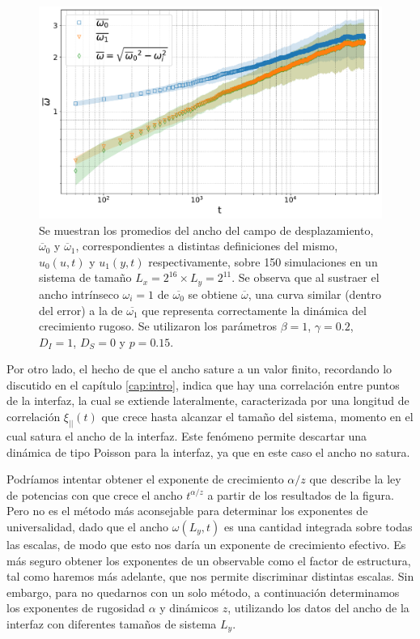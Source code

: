 \begin{figure}[t]
    \centering
    \includegraphics[width=\imsizeL]{omegas.pdf}
    \caption[Anchos $\overline{\omega}_0$ y $\overline{\omega}_1$ del frente de infectados]{Se muestran los promedios del ancho del campo de desplazamiento, $\overline{\omega}_0$ y $\overline{\omega}_1$, correspondientes a distintas definiciones del mismo, $u_0(u,t)$ y $u_1(y,t)$ respectivamente, sobre 150 simulaciones en un sistema de tamaño $L_x = 2^{16} \times L_y = 2^{11}$. Se observa que al sustraer el ancho intrínseco $\omega_i = 1$ de $\overline{\omega_0}$ se obtiene $\overline{\omega}$, una curva similar (dentro del error) a la de $\overline{\omega_1}$ que representa correctamente la dinámica del crecimiento rugoso. Se utilizaron los parámetros $\beta = 1$, $\gamma = 0.2$, $D_I = 1$, $D_S = 0$ y $p=0.15$.}  
    \label{fig:omegas}
\end{figure}

Por otro lado, el hecho de que el ancho sature a un valor finito, recordando lo discutido en el capítulo \ref{cap:intro}, indica que hay una correlación entre puntos de la interfaz, la cual se extiende lateralmente, caracterizada por una longitud de correlación $\xi_{||}(t)$ que crece hasta alcanzar el tamaño del sistema, momento en el cual satura el ancho de la interfaz. Este fenómeno permite descartar una dinámica de tipo Poisson para la interfaz, ya que en este caso el ancho no satura.

Podríamos intentar obtener el exponente de crecimiento $\alpha/z$ que describe la ley de potencias con que crece el ancho $t^{\alpha/z}$ a partir de los resultados de la figura. Pero no es el método más aconsejable para determinar los exponentes de universalidad, dado que el ancho $\omega(L_y,t)$ es una cantidad integrada sobre todas las escalas, de modo que esto nos daría un exponente de crecimiento efectivo. Es más seguro obtener los exponentes de un observable como el factor de estructura, tal como haremos más adelante, que nos permite discriminar distintas escalas. Sin embargo, para no quedarnos con un solo método, a continuación determinamos los exponentes de rugosidad $\alpha$ y dinámicos $z$, utilizando los datos del ancho de la interfaz con diferentes tamaños de sistema $L_y$.


